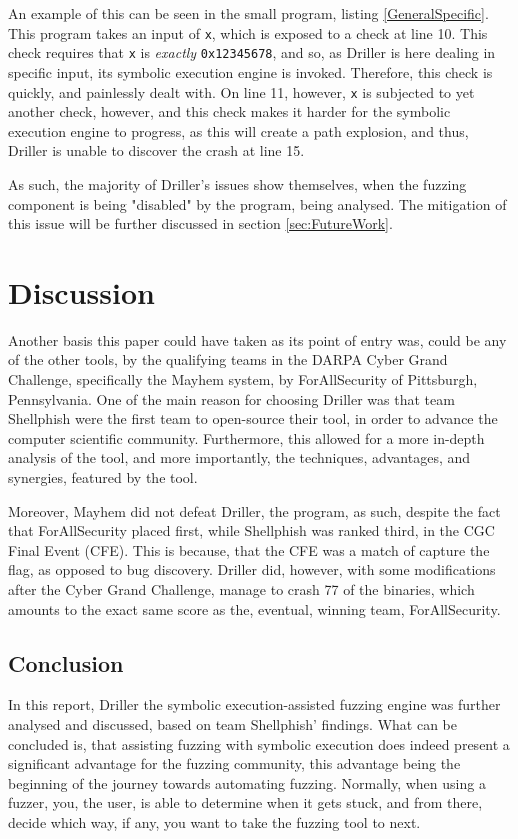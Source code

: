 \documentclass[a4paper]{article}
\newcommand{\tit}[1]{\textit{#1}}
\newcommand{\ttt}[1]{\texttt{#1}}
\begin{document}
An example of this can be seen in the small program, listing \ref{GeneralSpecific}. This program takes an input of \ttt{x}, which is exposed to a check at line 10. This check requires that \ttt{x} is \tit{exactly} \ttt{0x12345678}, and so, as Driller is here dealing in specific input, its symbolic execution engine is invoked. Therefore, this check is quickly, and painlessly dealt with. On line 11, however, \ttt{x} is subjected to yet another check, however, and this check makes it harder for the symbolic execution engine to progress, as this will create a path explosion, and thus, Driller is unable to discover the crash at line 15.

As such, the majority of Driller's issues show themselves, when the fuzzing component is being "disabled" by the program, being analysed. The mitigation of this issue will be further discussed in section \ref{sec:FutureWork}.
\section{Discussion}
\label{sec:Discussion}
Another basis this paper could have taken as its point of entry was, could be any of the other tools, by the qualifying teams in the DARPA Cyber Grand Challenge, specifically the Mayhem system, by ForAllSecurity of Pittsburgh, Pennsylvania. One of the main reason for choosing Driller was that team Shellphish were the first team to open-source their tool, in order to advance the computer scientific community. Furthermore, this allowed for a more in-depth analysis of the tool, and more importantly, the techniques, advantages, and synergies, featured by the tool.

Moreover, Mayhem did not defeat Driller, the program, as such, despite the fact that ForAllSecurity placed first, while Shellphish was ranked third, in the CGC Final Event (CFE). This is because, that the CFE was a match of capture the flag, as opposed to bug discovery. Driller did, however, with some modifications after the Cyber Grand Challenge, manage to crash 77 of the binaries, which amounts to the exact same score as the, eventual, winning team, ForAllSecurity.
\subsection{Conclusion}
\label{sec:Conclusion}
In this report, Driller the symbolic execution-assisted fuzzing engine was further analysed and discussed, based on team Shellphish' findings. What can be concluded is, that assisting fuzzing with symbolic execution does indeed present a significant advantage for the fuzzing community, this advantage being the beginning of the journey towards automating fuzzing. Normally, when using a fuzzer, you, the user, is able to determine when it gets stuck, and from there, decide which way, if any, you want to take the fuzzing tool to next.
\end{document}
